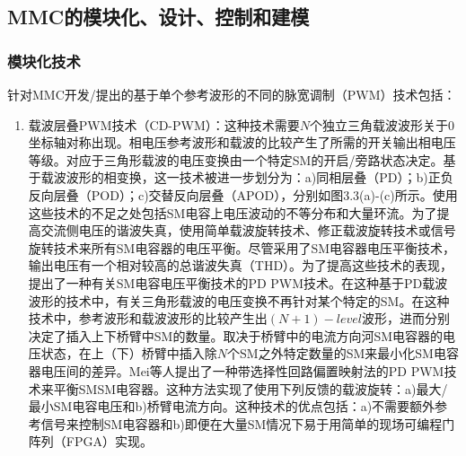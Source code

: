   \subsection{MMC的模块化、设计、控制和建模}
  
  \subsubsection{模块化技术}
  
  针对MMC开发/提出的基于单个参考波形的不同的脉宽调制（PWM）技术包括：
  \begin{enumerate}[1)]
  \item 载波层叠PWM技术（CD-PWM）：这种技术需要$N$个独立三角载波波形关于$0$坐标轴对称出现。相电压参考波形和载波的比较产生了所需的开关输出相电压等级。对应于三角形载波的电压变换由一个特定SM的开启/旁路状态决定。基于载波波形的相变换，这一技术被进一步划分为：a)同相层叠（PD）；b)正负反向层叠（POD）；c)交替反向层叠（APOD），分别如图3.3(a)-(c)所示。使用这些技术的不足之处包括SM电容上电压波动的不等分布和大量环流。为了提高交流侧电压的谐波失真，使用简单载波旋转技术、修正载波旋转技术或信号旋转技术来所有SM电容器的电压平衡。尽管采用了SM电容器电压平衡技术，输出电压有一个相对较高的总谐波失真（THD）。为了提高这些技术的表现，提出了一种有关SM电容电压平衡技术的PD PWM技术。在这种基于PD载波波形的技术中，有关三角形载波的电压变换不再针对某个特定的SM。在这种技术中，参考波形和载波波形的比较产生出$(N+1)-level$波形，进而分别决定了插入上下桥臂中SM的数量。取决于桥臂中的电流方向河SM电容器的电压状态，在上（下）桥臂中插入除$N$个SM之外特定数量的SM来最小化SM电容器电压间的差异。Mei等人提出了一种带选择性回路偏置映射法的PD PWM技术来平衡SMSM电容器。这种方法实现了使用下列反馈的载波旋转：a)最大/最小SM电容电压和b)桥臂电流方向。这种技术的优点包括：a)不需要额外参考信号来控制SM电容器和b)即便在大量SM情况下易于用简单的现场可编程门阵列（FPGA）实现。
\begin{figure}[H]
\begin{minipage}[t]{0.5\linewidth}
\centering

\end{minipage}
\end{figure}
\end{enumerate}
